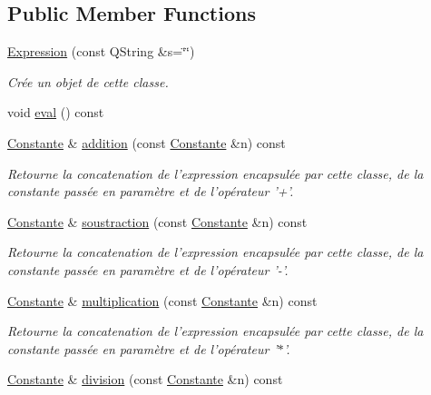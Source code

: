 \subsection*{\-Public \-Member \-Functions}
\begin{DoxyCompactItemize}
\item 
\hyperlink{classExpression_aa235eb34251cdfe3cd9c76bb236688fe}{\-Expression} (const \-Q\-String \&s=\char`\"{}\char`\"{})
\begin{DoxyCompactList}\small\item\em \-Crée un objet de cette classe. \end{DoxyCompactList}\item 
void \hyperlink{classExpression_a1cb7bec11fe237eba6caab975f7323e7}{eval} () const 
\item 
\hyperlink{classConstante}{\-Constante} \& \hyperlink{classExpression_a1c721aa4c3ea8e860fb229f719652667}{addition} (const \hyperlink{classConstante}{\-Constante} \&n) const 
\begin{DoxyCompactList}\small\item\em \-Retourne la concatenation de l'expression encapsulée par cette classe, de la constante passée en paramètre et de l'opérateur '+'. \end{DoxyCompactList}\item 
\hyperlink{classConstante}{\-Constante} \& \hyperlink{classExpression_abd4850801886dae0b74e0c22fd45006f}{soustraction} (const \hyperlink{classConstante}{\-Constante} \&n) const 
\begin{DoxyCompactList}\small\item\em \-Retourne la concatenation de l'expression encapsulée par cette classe, de la constante passée en paramètre et de l'opérateur '-\/'. \end{DoxyCompactList}\item 
\hyperlink{classConstante}{\-Constante} \& \hyperlink{classExpression_af3b11dc48c440f08df10aa98aaf11deb}{multiplication} (const \hyperlink{classConstante}{\-Constante} \&n) const 
\begin{DoxyCompactList}\small\item\em \-Retourne la concatenation de l'expression encapsulée par cette classe, de la constante passée en paramètre et de l'opérateur '$\ast$'. \end{DoxyCompactList}\item 
\hyperlink{classConstante}{\-Constante} \& \hyperlink{classExpression_ae9b021228fe5cbbe66583784a4f9ed40}{division} (const \hyperlink{classConstante}{\-Constante} \&n) const 

\end{DoxyCompactItemize}

